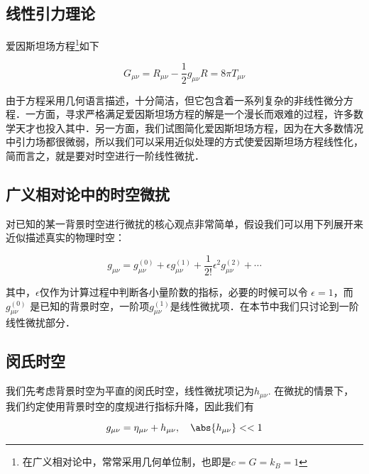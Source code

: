 
\begin{issues}
\issueMissDepend
\issueDraft
\end{issues}



\subsection{线性引力理论}
爱因斯坦场方程\footnote{在广义相对论中，常常采用几何单位制，也即是$c=G=k_B=1$}如下

\begin{equation}\label{LinGra_eq2}
G_{\mu \nu} = R_{\mu \nu} - \frac{1}{2}g_{\mu\nu}R = 8\pi T_{\mu\nu}
\end{equation}

由于方程采用几何语言描述，十分简洁，但它包含着一系列复杂的非线性微分方程．一方面，寻求严格满足爱因斯坦场方程的解是一个漫长而艰难的过程，许多数学天才也投入其中．另一方面，我们试图简化爱因斯坦场方程，因为在大多数情况中引力场都很微弱，所以我们可以采用近似处理的方式使爱因斯坦场方程线性化，简而言之，就是要对时空进行一阶线性微扰．


\subsection{广义相对论中的时空微扰}

对已知的某一背景时空进行微扰的核心观点非常简单，假设我们可以用下列展开来近似描述真实的物理时空：

\begin{equation}
g_{\mu\nu}=g^{(0)}_{\mu\nu} + \epsilon g^{(1)}_{\mu\nu} + \frac{1}{2!}\epsilon^2 g^{(2)}_{\mu\nu}+\cdots
\end{equation}

其中，$\epsilon $仅作为计算过程中判断各小量阶数的指标，必要的时候可以令 $\epsilon = 1 $，而$g^{(0)}_{\mu\nu} $ 是已知的背景时空，一阶项$g^{(1)}_{\mu\nu}$是线性微扰项．在本节中我们只讨论到一阶线性微扰部分．


\subsection{闵氏时空}

我们先考虑背景时空为平直的闵氏时空，线性微扰项记为$h_{\mu\nu}$. 在微扰的情景下，我们约定使用背景时空的度规进行指标升降，因此我们有

\begin{equation}
g_{\mu\nu} = \eta_{\mu\nu} + h_{\mu\nu}, \quad \abs{h_{\mu\nu}}<<1 
\end{equation}

